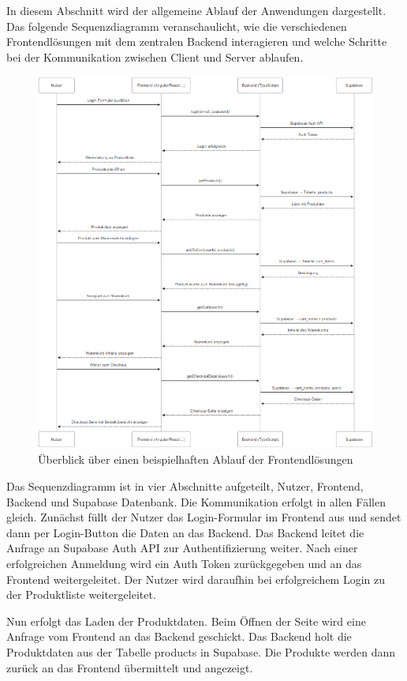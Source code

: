 \documentclass[oneside]{ausarbeitung}
\begin{document}
In diesem Abschnitt wird der allgemeine Ablauf der Anwendungen dargestellt. Das folgende Sequenzdiagramm veranschaulicht, wie die verschiedenen Frontendlösungen mit dem zentralen Backend interagieren und welche Schritte bei der Kommunikation zwischen Client und Server ablaufen.

\begin{figure}[H]
    \centering
    \includegraphics[width=\textwidth]{images/sequenzdiagramm}
    \caption{Überblick über einen beispielhaften Ablauf der Frontendlösungen}
    \label{fig:applikationsstruktur}
\end{figure}

Das Sequenzdiagramm ist in vier Abschnitte aufgeteilt, Nutzer, Frontend, Backend und Supabase Datenbank. Die Kommunikation erfolgt in allen Fällen gleich. 
Zunächst füllt der Nutzer das Login-Formular im Frontend aus und sendet dann per Login-Button die Daten an das Backend. Das Backend leitet die Anfrage an Supabase Auth API zur Authentifizierung weiter. Nach einer erfolgreichen Anmeldung wird ein Auth Token zurückgegeben und an das Frontend weitergeleitet. Der Nutzer wird daraufhin bei erfolgreichem Login zu der Produktliste weitergeleitet.

Nun erfolgt das Laden der Produktdaten. Beim Öffnen der Seite wird eine Anfrage vom Frontend an das Backend geschickt. Das Backend holt die Produktdaten aus der Tabelle products in Supabase. Die Produkte werden dann zurück an das Frontend übermittelt und angezeigt.
\end{document}
